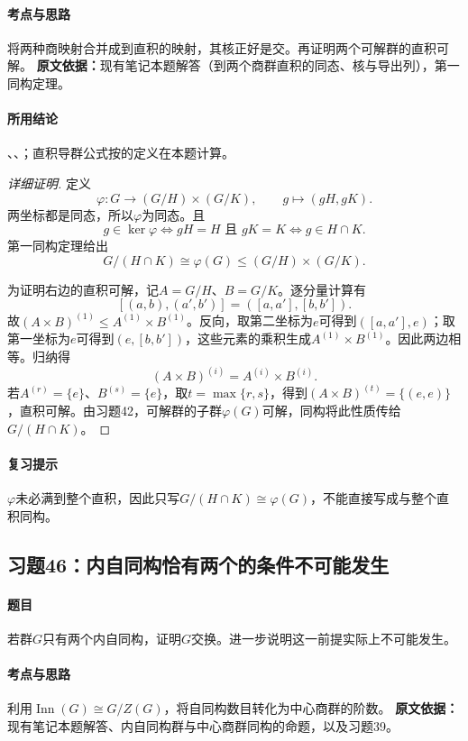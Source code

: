 \paragraph{考点与思路}将两种商映射合并成到直积的映射，其核正好是交。再证明两个可解群的直积可解。
\textbf{原文依据：}现有笔记本题解答（到两个商群直积的同态、核与导出列），第一同构定理。
\paragraph{所用结论}、、；直积导群公式按的定义在本题计算。
\begin{proof}[详细证明]
定义
\[
\varphi:G\longrightarrow(G/H)\times(G/K),
\qquad g\longmapsto(gH,gK).
\]
两坐标都是同态，所以$\varphi$为同态。且
\[
g\in\ker\varphi\iff gH=H\text{ 且 }gK=K
\iff g\in H\cap K.
\]
第一同构定理给出
\[
G/(H\cap K)\cong\varphi(G)\le(G/H)\times(G/K).
\]

为证明右边的直积可解，记$A=G/H$、$B=G/K$。逐分量计算有
\[
[(a,b),(a',b')]=([a,a'],[b,b']).
\]
故$(A\times B)^{(1)}\le A^{(1)}\times B^{(1)}$。反向，取第二坐标为$e$可得到$([a,a'],e)$；取第一坐标为$e$可得到$(e,[b,b'])$，这些元素的乘积生成$A^{(1)}\times B^{(1)}$。因此两边相等。归纳得
\[
(A\times B)^{(i)}=A^{(i)}\times B^{(i)}.
\]
若$A^{(r)}=\{e\}$、$B^{(s)}=\{e\}$，取$t=\max\{r,s\}$，得到$(A\times B)^{(t)}=\{(e,e)\}$，直积可解。由习题42，可解群的子群$\varphi(G)$可解，同构将此性质传给$G/(H\cap K)$。
\end{proof}
\paragraph{复习提示}$\varphi$未必满到整个直积，因此只写$G/(H\cap K)\cong\varphi(G)$，不能直接写成与整个直积同构。

\subsection{习题46：内自同构恰有两个的条件不可能发生}
\paragraph{题目}若群$G$只有两个内自同构，证明$G$交换。进一步说明这一前提实际上不可能发生。
\paragraph{考点与思路}利用$\operatorname{Inn}(G)\cong G/Z(G)$，将自同构数目转化为中心商群的阶数。
\textbf{原文依据：}现有笔记本题解答、内自同构群与中心商群同构的命题，以及习题39。
